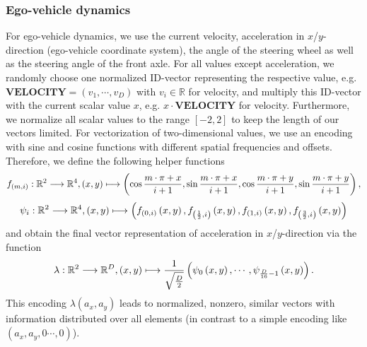 \subsubsection{Ego-vehicle dynamics} 
For ego-vehicle dynamics, we use the current velocity, acceleration in $x$/$y$-direction (ego-vehicle coordinate system), the angle of the steering wheel as well as the steering angle of the front axle. 
For all values except acceleration, we randomly choose one normalized ID-vector representing the respective value, e.g. $\mathbf{VELOCITY}=\left(v_1, \cdots, v_D\right)$ with $v_i \in \mathbb{R}$ for velocity, and multiply this ID-vector with the current scalar value $x$, e.g. $x \cdot \mathbf{VELOCITY}$ for velocity.
Furthermore, we normalize all scalar values to the range $\left[-2,2\right]$ to keep the length of our vectors limited.
For vectorization of two-dimensional values, we use an encoding with sine and cosine functions with different spatial frequencies and offsets. 
Therefore, we define the following helper functions
\[ f_{\left(m,i\right)}: \mathbb{R}^2 \longrightarrow \mathbb{R}^4, \left(x,y\right) \longmapsto \left(\cos\frac{m\cdot \pi + x}{i + 1}, \sin\frac{m\cdot \pi + x}{i + 1}, \cos\frac{m\cdot \pi + y}{i + 1}, \sin\frac{m\cdot \pi + y}{i + 1}\right),
\]
\[
\psi_i: \mathbb{R}^2 \longrightarrow \mathbb{R}^4, \left(x,y\right) \longmapsto \left(f_{\left(0,i\right)}\left(x,y\right), f_{\left(\frac{1}{2},i\right)}\left(x,y\right), f_{\left(1,i\right)}\left(x,y\right), f_{\left(\frac{3}{2},i\right)}\left(x,y\right)\right)
\]
and obtain the final vector representation of acceleration in $x$/$y$-direction via the function
\[
\lambda: \mathbb{R}^2 \longrightarrow \mathbb{R}^D, \left(x,y\right) \longmapsto \frac{1}{\sqrt{\frac{D}{2}}}\left(\psi_0\left(x,y\right), \cdots, \psi_{\frac{D}{16}-1}\left(x,y\right)\right).
\]
This encoding $\lambda\left(a_x, a_y\right)$ leads to normalized, nonzero, similar vectors with information distributed over all elements (in contrast to a simple encoding like $\left(a_x, a_y, 0 \cdots, 0\right)$).\\
